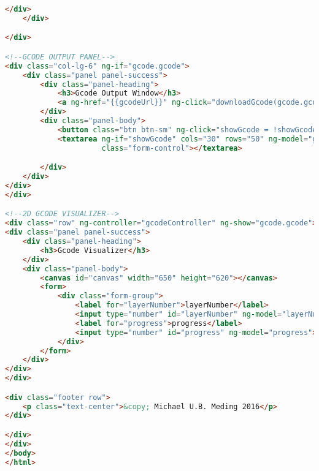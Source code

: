 \begin{lstlisting}[language=HTML, label={lst:index}, caption=As this is a single page web application this is the only HTML file. It contains all of the libraries needed to run all subsequent sections.]
        </div>
    </div>

</div>

<!--GCODE OUTPUT PANEL-->
<div class="col-lg-6" ng-if="gcode.gcode">
    <div class="panel panel-success">
        <div class="panel-heading">
            <h3>Gcode Output Window</h3>
            <a ng-href="{{gcodeUrl}}" ng-click="downloadGcode(gcode.gcode)">download gcode</a>
        </div>
        <div class="panel-body">
            <button class="btn btn-sm" ng-click="showGcode = !showGcode" data-toggle="tooltip" data-placement="bottom" title="WARNING! This may freeze browser!">press to view gcode</button>
            <textarea ng-if="showGcode" cols="30" rows="50" ng-model="gcode.gcode"
                      class="form-control"></textarea>

        </div>
    </div>
</div>
</div>

<!--2D GCODE VISUALIZER-->
<div class="row" ng-controller="gcodeController" ng-show="gcode.gcode">
<div class="panel panel-success">
    <div class="panel-heading">
        <h3>Gcode Visualizer</h3>
    </div>
    <div class="panel-body">
        <canvas id="canvas" width="650" height="620"></canvas>
        <form>
            <div class="form-group">
                <label for="layerNumber">layerNumber</label>
                <input type="number" id="layerNumber" ng-model="layerNumber">
                <label for="progress">progress</label>
                <input type="number" id="progress" ng-model="progress">
            </div>
        </form>
    </div>
</div>
</div>

<div class="footer row">
    <p class="text-center">&copy; Michael U.B. Meding 2016</p>
</div>

</div>
</div>
</body>
</html>
\end{lstlisting}

